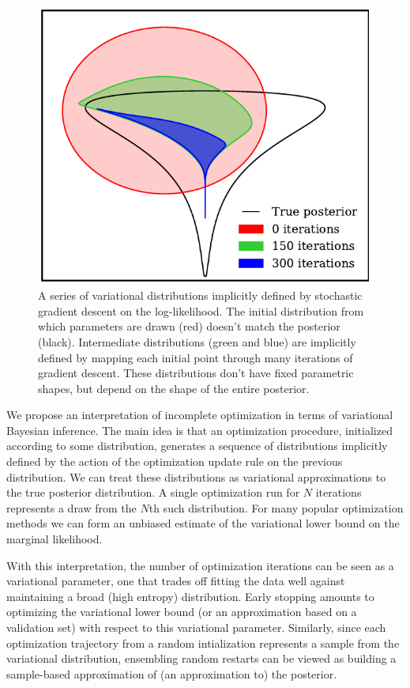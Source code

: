 \documentclass[]{article}
\begin{document}
\begin{figure}[t]
\vskip 0.2in
\begin{center}
\includegraphics[width=\columnwidth]{../experiments/2015_03_02_funnel/2/dists.pdf}
\caption{A series of variational distributions implicitly defined by
  stochastic gradient descent on the log-likelihood.
  The initial distribution from which parameters are drawn (red) doesn't match the posterior (black).
  Intermediate distributions (green and blue) are implicitly defined by mapping each initial point through many iterations of gradient descent.
  These distributions don't have fixed parametric shapes, but depend on the shape of the entire posterior.}
\label{fig:cartoon}
\end{center}
\end{figure}

We propose an interpretation of incomplete optimization in terms of variational
Bayesian inference.  The main idea is that an optimization procedure, initialized
according to some distribution, generates a sequence of distributions implicitly
defined by the action of the optimization update rule on the previous
distribution. We can treat these distributions as variational approximations to
the true posterior distribution. A single optimization run for $N$ iterations
represents a draw from the $N$th such distribution. For many popular
optimization methods we can form an unbiased estimate of the variational lower
bound on the marginal likelihood.

With this interpretation, the number of optimization iterations can be seen as a
variational parameter, one that trades off fitting the data well against
maintaining a broad (high entropy) distribution. Early stopping amounts to
optimizing the variational lower bound (or an approximation based on a
validation set) with respect to this variational parameter. Similarly, since
each optimization trajectory from a random intialization represents a sample
from the variational distribution, ensembling random restarts can be viewed as
building a sample-based approximation of (an approximation to) the posterior.
\end{document}
